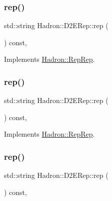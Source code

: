 \subsubsection{\texorpdfstring{rep()}{rep()}\hspace{0.1cm}{\footnotesize\ttfamily [3/5]}}
{\footnotesize\ttfamily std\+::string Hadron\+::\+D2\+E\+Rep\+::rep (\begin{DoxyParamCaption}{ }\end{DoxyParamCaption}) const\hspace{0.3cm}{\ttfamily [inline]}, {\ttfamily [virtual]}}



Implements \mbox{\hyperlink{structHadron_1_1RepRep_ab3213025f6de249f7095892109575fde}{Hadron\+::\+Rep\+Rep}}.

\mbox{\label{structHadron_1_1D2ERep_a5fbd82820d3cde321d9208b7208873fb}} 
\subsubsection{\texorpdfstring{rep()}{rep()}\hspace{0.1cm}{\footnotesize\ttfamily [4/5]}}
{\footnotesize\ttfamily std\+::string Hadron\+::\+D2\+E\+Rep\+::rep (\begin{DoxyParamCaption}{ }\end{DoxyParamCaption}) const\hspace{0.3cm}{\ttfamily [inline]}, {\ttfamily [virtual]}}



Implements \mbox{\hyperlink{structHadron_1_1RepRep_ab3213025f6de249f7095892109575fde}{Hadron\+::\+Rep\+Rep}}.

\mbox{\label{structHadron_1_1D2ERep_a5fbd82820d3cde321d9208b7208873fb}} 
\subsubsection{\texorpdfstring{rep()}{rep()}\hspace{0.1cm}{\footnotesize\ttfamily [5/5]}}
{\footnotesize\ttfamily std\+::string Hadron\+::\+D2\+E\+Rep\+::rep (\begin{DoxyParamCaption}{ }\end{DoxyParamCaption}) const\hspace{0.3cm}{\ttfamily [inline]}, {\ttfamily [virtual]}}



